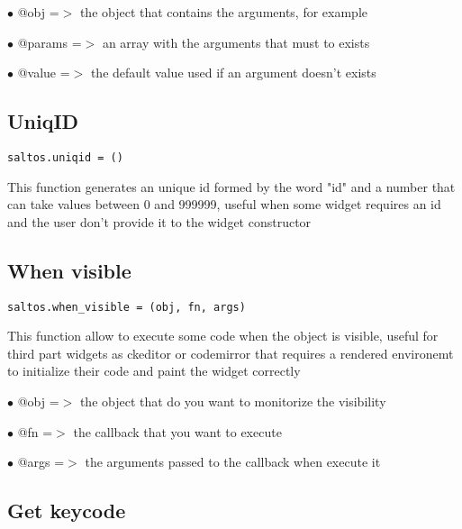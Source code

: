 \documentclass[a4paper]{book}
\begin{document}
\begin{compactitem}
\item[\color{myblue}$\bullet$] @obj    =$>$ the object that contains the arguments, for example
\item[\color{myblue}$\bullet$] @params =$>$ an array with the arguments that must to exists
\item[\color{myblue}$\bullet$] @value  =$>$ the default value used if an argument doesn't exists
\end{compactitem}

\hypertarget{toc422}{}
\subsection{UniqID}

\begin{lstlisting}
saltos.uniqid = ()
\end{lstlisting}

This function generates an unique id formed by the word "id" and a number that can take
values between 0 and 999999, useful when some widget requires an id and the user don't
provide it to the widget constructor

\hypertarget{toc423}{}
\subsection{When visible}

\begin{lstlisting}
saltos.when_visible = (obj, fn, args)
\end{lstlisting}

This function allow to execute some code when the object is visible, useful for third part
widgets as ckeditor or codemirror that requires a rendered environemt to initialize their
code and paint the widget correctly

\begin{compactitem}
\item[\color{myblue}$\bullet$] @obj  =$>$ the object that do you want to monitorize the visibility
\item[\color{myblue}$\bullet$] @fn   =$>$ the callback that you want to execute
\item[\color{myblue}$\bullet$] @args =$>$ the arguments passed to the callback when execute it
\end{compactitem}

\hypertarget{toc424}{}
\subsection{Get keycode}
\end{document}
